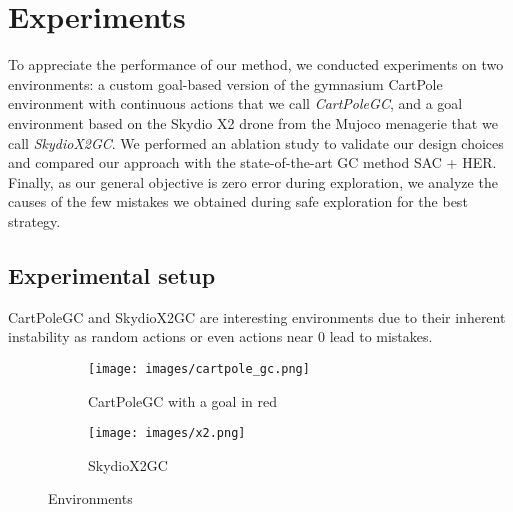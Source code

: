 \section{Experiments}

To appreciate the performance of our method, we conducted experiments on two environments: a custom goal-based version of the gymnasium CartPole environment \cite{towers2024gymnasium} with continuous actions that we call \textit{CartPoleGC}, and a goal environment based on the Skydio X2 drone from the Mujoco menagerie \cite{menagerie2022github} that we call \textit{SkydioX2GC}. We performed an ablation study to validate our design choices and compared our approach with the state-of-the-art GC method SAC + HER. Finally, as our general objective is zero error during exploration, we analyze the causes of the few mistakes we obtained during safe exploration for the best strategy.

\subsection{Experimental setup}

CartPoleGC and SkydioX2GC are interesting environments due to their inherent instability as random actions or even actions near 0 lead to mistakes.

\begin{figure}[ht]
    \begin{subfigure}{0.25\textwidth}  %
        \centering 
        \texttt{[image: images/cartpole\_gc.png]}
        \caption{CartPoleGC with a goal in red}
        \label{fig:cartpole_gc}
    \end{subfigure}
    \hfill
    \begin{subfigure}{0.14\textwidth} %
        \centering
        \texttt{[image: images/x2.png]}
        \caption{SkydioX2GC}
        \label{fig:x2}
    \end{subfigure}
    \caption{Environments}
    \label{fig:envs}
\end{figure}



